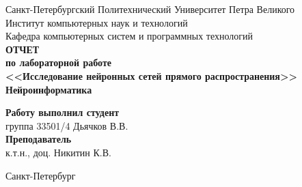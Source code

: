 \begin{titlepage}
\begin{center}
	Санкт-Петербургский Политехнический Университет Петра Великого\\[0.3cm]
	Институт компьютерных наук и технологий \\[0.3cm]
	Кафедра компьютерных систем и программных технологий\\[4cm]
	
	\textbf{ОТЧЕТ}\\ 
	\textbf{по лабораторной работе}\\[0.5cm]
	\textbf{<<Исследование нейронных сетей прямого распространения>>}\\[0.1cm]
	\textbf{Нейроинформатика}\\[4.0cm]
\end{center}

\begin{flushright}
	\begin{minipage}{0.45\textwidth}
		\textbf{Работу выполнил студент}\\[3mm]
		группа 33501/4 \hspace*{10mm} Дьячков В.В.\\[5mm]
		\textbf{Преподаватель}\\[5mm]
		\sign[1.7cm] \hspace*{1mm} к.т.н., доц. Никитин К.В. \\[5mm]
	\end{minipage}
\end{flushright}

\vfill

\begin{center}
	Санкт-Петербург\\
	\the\year
\end{center}
\end{titlepage}

\addtocounter{page}{1}